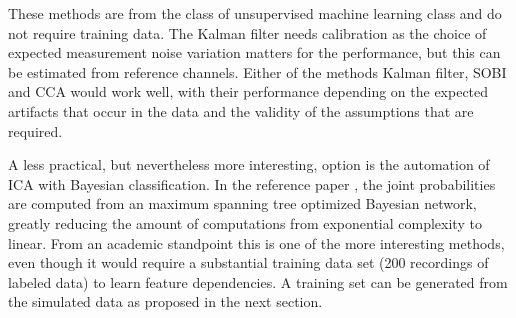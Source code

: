 \documentclass[twoside]{article}
\begin{document}
These methods are from the class of unsupervised machine learning class and do not require training data. The Kalman filter needs calibration as the choice of expected measurement noise variation matters for the performance, but this can be estimated from reference channels. Either of the methods Kalman filter, SOBI and CCA would work well, with their performance depending on the expected artifacts that occur in the data and the validity of the assumptions that are required. 

A less practical, but nevertheless more interesting, option is the automation of ICA with Bayesian classification. In the reference paper \cite{automatedica}, the joint probabilities are computed from an maximum spanning tree optimized Bayesian network, greatly reducing the amount of computations from exponential complexity to linear. From an academic standpoint this is one of the more interesting methods, even though it would require a substantial training data set (200 recordings of labeled data) to learn feature dependencies. A training set can be generated from the simulated data as proposed in the next section. 



 
\end{document}
